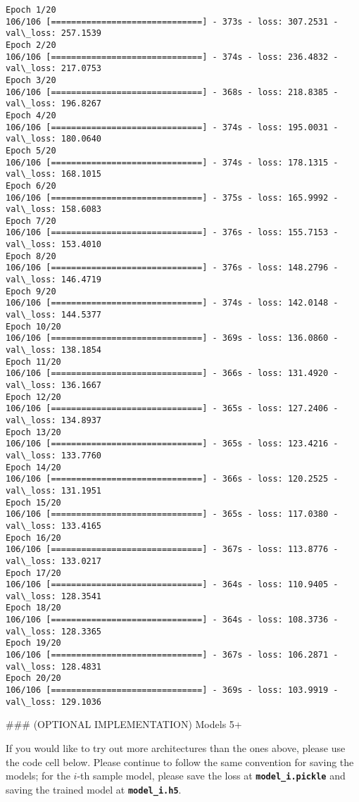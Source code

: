 \documentclass[11pt]{article}
\begin{document}
    \begin{Verbatim}[commandchars=\\\{\}]
Epoch 1/20
106/106 [==============================] - 373s - loss: 307.2531 - val\_loss: 257.1539
Epoch 2/20
106/106 [==============================] - 374s - loss: 236.4832 - val\_loss: 217.0753
Epoch 3/20
106/106 [==============================] - 368s - loss: 218.8385 - val\_loss: 196.8267
Epoch 4/20
106/106 [==============================] - 374s - loss: 195.0031 - val\_loss: 180.0640
Epoch 5/20
106/106 [==============================] - 374s - loss: 178.1315 - val\_loss: 168.1015
Epoch 6/20
106/106 [==============================] - 375s - loss: 165.9992 - val\_loss: 158.6083
Epoch 7/20
106/106 [==============================] - 376s - loss: 155.7153 - val\_loss: 153.4010
Epoch 8/20
106/106 [==============================] - 376s - loss: 148.2796 - val\_loss: 146.4719
Epoch 9/20
106/106 [==============================] - 374s - loss: 142.0148 - val\_loss: 144.5377
Epoch 10/20
106/106 [==============================] - 369s - loss: 136.0860 - val\_loss: 138.1854
Epoch 11/20
106/106 [==============================] - 366s - loss: 131.4920 - val\_loss: 136.1667
Epoch 12/20
106/106 [==============================] - 365s - loss: 127.2406 - val\_loss: 134.8937
Epoch 13/20
106/106 [==============================] - 365s - loss: 123.4216 - val\_loss: 133.7760
Epoch 14/20
106/106 [==============================] - 366s - loss: 120.2525 - val\_loss: 131.1951
Epoch 15/20
106/106 [==============================] - 365s - loss: 117.0380 - val\_loss: 133.4165
Epoch 16/20
106/106 [==============================] - 367s - loss: 113.8776 - val\_loss: 133.0217
Epoch 17/20
106/106 [==============================] - 364s - loss: 110.9405 - val\_loss: 128.3541
Epoch 18/20
106/106 [==============================] - 364s - loss: 108.3736 - val\_loss: 128.3365
Epoch 19/20
106/106 [==============================] - 367s - loss: 106.2871 - val\_loss: 128.4831
Epoch 20/20
106/106 [==============================] - 369s - loss: 103.9919 - val\_loss: 129.1036

    \end{Verbatim}

     \#\#\# (OPTIONAL IMPLEMENTATION) Models 5+

If you would like to try out more architectures than the ones above,
please use the code cell below. Please continue to follow the same
convention for saving the models; for the \(i\)-th sample model, please
save the loss at \textbf{\texttt{model\_i.pickle}} and saving the
trained model at \textbf{\texttt{model\_i.h5}}.
\end{document}
